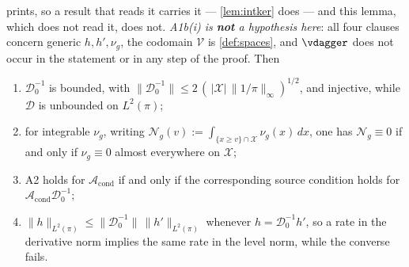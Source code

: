 \begin{lemma}
prints, so a result that reads it carries it --- \cref{lem:intker} does --- and this lemma, which does
not read it, does not.
\emph{A1b(i) is \textbf{not} a hypothesis here}: all
four clauses concern generic $h,h',\nu_g$, the codomain $\mathcal V$ is \cref{def:spaces}, and
$\vdagger$ does not occur in the statement or in any step of the proof. Then
\begin{enumerate}
\item[(i)] $\mathcal D^{-1}_0$ is bounded, with
$\|\mathcal D^{-1}_0\|\le2\,(\,|\mathcal X|\,\|1/\pi\|_\infty)^{1/2}$, and injective, while
$\mathcal D$ is unbounded on $L^{2}(\pi)$;
\item[(ii)] for integrable $\nu_g$, writing $\mathcal N_g(v):=\int_{\{x\ge v\}\cap\mathcal X}\nu_g(x)\,dx$,
one has $\mathcal N_g\equiv0$ if and only if $\nu_g\equiv0$ almost everywhere on $\mathcal X$;
\item[(iii)] A2 holds for $\mathcal A_{\mathrm{cond}}$ if and only if the corresponding source condition
holds for $\mathcal A_{\mathrm{cond}}\mathcal D^{-1}_0$;
\item[(iv)] $\|h\|_{L^{2}(\pi)}\le\|\mathcal D^{-1}_0\|\,\|h'\|_{L^{2}(\pi)}$ whenever
$h=\mathcal D^{-1}_0h'$, so a rate in the derivative norm implies the same rate in the level norm, while
the converse fails.
\end{enumerate}
\end{lemma}

